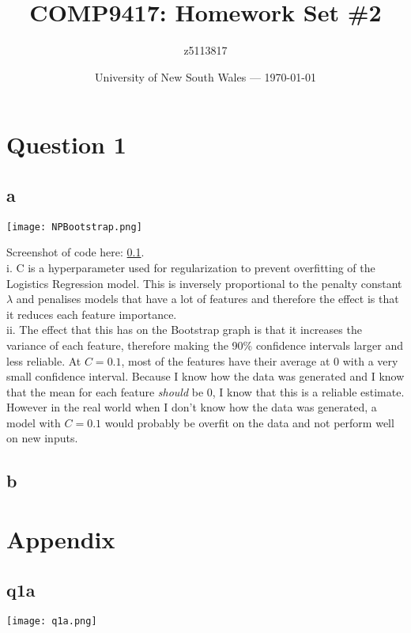 \documentclass{article}
\title{COMP9417: Homework Set \#2} %
\author{z5113817} %
\date{University of New South Wales --- \today} %
\begin{document}




\section*{Question 1}

\subsection*{a}

\texttt{[image: NPBootstrap.png]}

Screenshot of code here: \ref{code:q1a}.\\

i. C is a hyperparameter used for regularization to prevent overfitting of the Logistics Regression
model. This is inversely proportional to the penalty constant \(\lambda\) and penalises
models that have a lot of features and therefore the effect is that it reduces each feature importance.\\

ii. The effect that this has on the Bootstrap graph is that it increases the variance of 
each feature, therefore making the 90\% confidence intervals larger and less reliable. At \(C = 0.1\),
most of the features have their average at 0 with a very small confidence interval. Because I know 
how the data was generated and I know that the mean for each feature \emph{should} be 0, 
I know that this is a reliable estimate. However in the real world when I don't know 
how the data was generated, a model with \(C = 0.1\) would probably be overfit on the 
data and not perform well on new inputs.\\

\newpage

\subsection*{b}




\newpage
\section*{Appendix}

\subsection{q1a}
\label{code:q1a}
\texttt{[image: q1a.png]}
\end{document}
